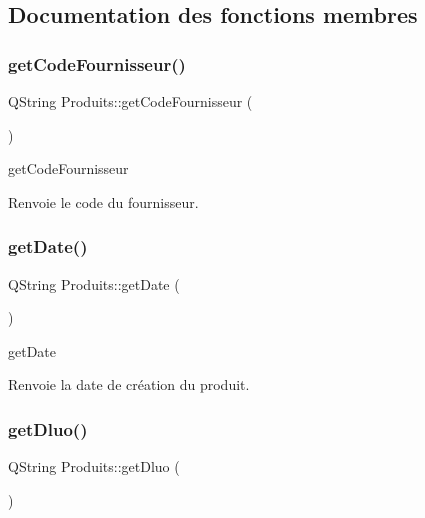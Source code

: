 \subsection{Documentation des fonctions membres}
\mbox{\label{class_produits_a4e9998c0b687c784dd94b070f91040fd}} 
\subsubsection{\texorpdfstring{get\+Code\+Fournisseur()}{getCodeFournisseur()}}
{\footnotesize\ttfamily Q\+String Produits\+::get\+Code\+Fournisseur (\begin{DoxyParamCaption}{ }\end{DoxyParamCaption})}



get\+Code\+Fournisseur 

\begin{DoxyReturn}{Renvoie}
le code du fournisseur. 
\end{DoxyReturn}
\mbox{\label{class_produits_a66bdd66bb570daecc6b5b0401c8eb774}} 
\subsubsection{\texorpdfstring{get\+Date()}{getDate()}}
{\footnotesize\ttfamily Q\+String Produits\+::get\+Date (\begin{DoxyParamCaption}{ }\end{DoxyParamCaption})}



get\+Date 

\begin{DoxyReturn}{Renvoie}
la date de création du produit. 
\end{DoxyReturn}
\mbox{\label{class_produits_a7eeb9647a3fcf2a21e0d15da7fb5910c}} 
\subsubsection{\texorpdfstring{get\+Dluo()}{getDluo()}}
{\footnotesize\ttfamily Q\+String Produits\+::get\+Dluo (\begin{DoxyParamCaption}{ }\end{DoxyParamCaption})}



